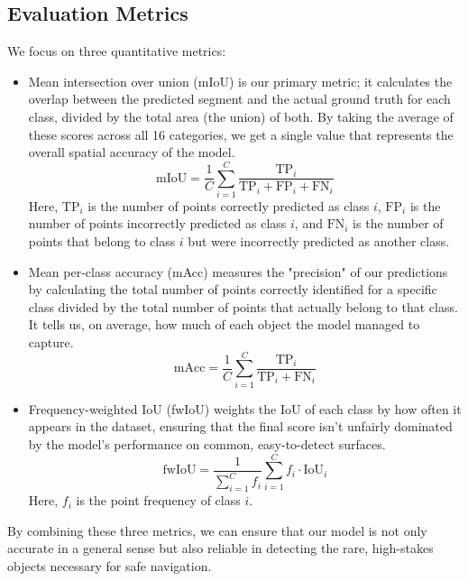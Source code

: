 \documentclass[10pt,twocolumn,letterpaper]{article}
\begin{document}
\subsection{Evaluation Metrics}
We focus on three quantitative metrics:
\begin{itemize}
    \item Mean intersection over union (mIoU) is our primary metric; it calculates the overlap between the predicted segment and the actual ground truth for each class, divided by the total area (the union) of both. By taking the average of these scores across all 16 categories, we get a single value that represents the overall spatial accuracy of the model.
    \[
        \text{mIoU} = \frac{1}{C} \sum_{i=1}^C \frac{\text{TP}_i}{\text{TP}_i + \text{FP}_i + \text{FN}_i}
    \]
    Here, $\text{TP}_i$ is the number of points correctly predicted as class $i$, $\text{FP}_i$ is the number of points incorrectly predicted as class $i$, and $\text{FN}_i$ is the number of points that belong to class $i$ but were incorrectly predicted as another class.

    \item Mean per-class accuracy (mAcc) measures the "precision" of our predictions by calculating the total number of points correctly identified for a specific class divided by the total number of points that actually belong to that class. It tells us, on average, how much of each object the model managed to capture.
    \[
        \text{mAcc} = \frac{1}{C} \sum_{i=1}^C \frac{\text{TP}_i}{\text{TP}_i + \text{FN}_i} 
    \]

    \item Frequency-weighted IoU (fwIoU) weights the IoU of each class by how often it appears in the dataset, ensuring that the final score isn't unfairly dominated by the model's performance on common, easy-to-detect surfaces.
    \[
        \text{fwIoU} = \frac{1}{\sum_{i=1}^C f_i} \sum_{i=1}^C f_i \cdot \text{IoU}_i
    \]
    Here, $f_i$ is the point frequency of class $i$.
\end{itemize}
By combining these three metrics, we can ensure that our model is not only accurate in a general sense but also reliable in detecting the rare, high-stakes objects necessary for safe navigation.
\end{document}
